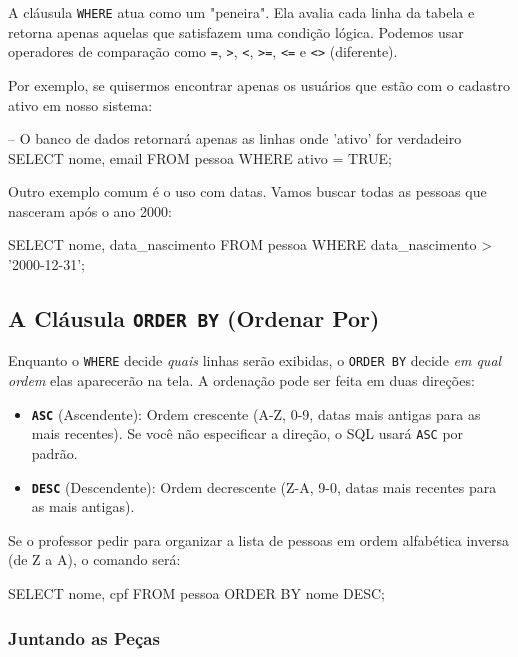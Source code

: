 A cláusula \texttt{WHERE} atua como um "peneira". Ela avalia cada linha da tabela e retorna apenas aquelas que satisfazem uma condição lógica. Podemos usar operadores de comparação como \texttt{=}, \texttt{>}, \texttt{<}, \texttt{>=}, \texttt{<=} e \texttt{<>} (diferente).



Por exemplo, se quisermos encontrar apenas os usuários que estão com o cadastro ativo em nosso sistema:

\begin{sqlcode}
-- O banco de dados retornará apenas as linhas onde 'ativo' for verdadeiro
SELECT nome, email 
FROM pessoa 
WHERE ativo = TRUE;
\end{sqlcode}

Outro exemplo comum é o uso com datas. Vamos buscar todas as pessoas que nasceram após o ano 2000:

\begin{sqlcode}
SELECT nome, data_nascimento 
FROM pessoa 
WHERE data_nascimento > '2000-12-31';
\end{sqlcode}

\subsection{A Cláusula \texttt{ORDER BY} (Ordenar Por)}

Enquanto o \texttt{WHERE} decide \textit{quais} linhas serão exibidas, o \texttt{ORDER BY} decide \textit{em qual ordem} elas aparecerão na tela. A ordenação pode ser feita em duas direções:

\begin{itemize}
    \item \textbf{\texttt{ASC}} (Ascendente): Ordem crescente (A-Z, 0-9, datas mais antigas para as mais recentes). Se você não especificar a direção, o SQL usará \texttt{ASC} por padrão.
    \item \textbf{\texttt{DESC}} (Descendente): Ordem decrescente (Z-A, 9-0, datas mais recentes para as mais antigas).
\end{itemize}
Se o professor pedir para organizar a lista de pessoas em ordem alfabética inversa (de Z a A), o comando será:
\begin{sqlcode}
SELECT nome, cpf 
FROM pessoa 
ORDER BY nome DESC;
\end{sqlcode}

\subsubsection{Juntando as Peças}

